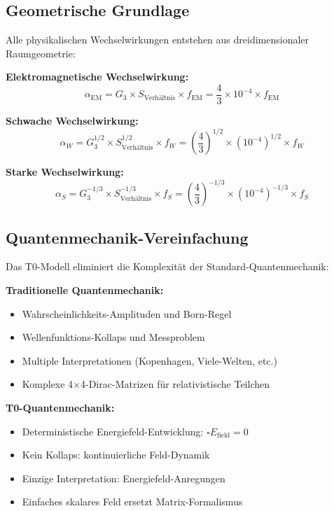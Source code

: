 \documentclass[12pt,a4paper]{report}
\begin{document}
	\subsection{Geometrische Grundlage}
	\label{subsec:geometric_foundation}
	
	Alle physikalischen Wechselwirkungen entstehen aus dreidimensionaler Raumgeometrie:
	
	\textbf{Elektromagnetische Wechselwirkung:}
	\begin{equation}
		\alpha_{\text{EM}} = G_3 \times S_{\text{Verhältnis}} \times f_{\text{EM}} = \frac{4}{3} \times 10^{-4} \times f_{\text{EM}}
	\end{equation}
	
	\textbf{Schwache Wechselwirkung:}
	\begin{equation}
		\alpha_W = G_3^{1/2} \times S_{\text{Verhältnis}}^{1/2} \times f_W = \left(\frac{4}{3}\right)^{1/2} \times (10^{-4})^{1/2} \times f_W
	\end{equation}
	
	\textbf{Starke Wechselwirkung:}
	\begin{equation}
		\alpha_S = G_3^{-1/3} \times S_{\text{Verhältnis}}^{-1/3} \times f_S = \left(\frac{4}{3}\right)^{-1/3} \times (10^{-4})^{-1/3} \times f_S
	\end{equation}
	
	\subsection{Quantenmechanik-Vereinfachung}
	\label{subsec:quantum_mechanics_simplification}
	
	Das T0-Modell eliminiert die Komplexität der Standard-Quantenmechanik:
	
	\textbf{Traditionelle Quantenmechanik:}
	\begin{itemize}
		\item Wahrscheinlichkeits-Amplituden und Born-Regel
		\item Wellenfunktions-Kollaps und Messproblem
		\item Multiple Interpretationen (Kopenhagen, Viele-Welten, etc.)
		\item Komplexe 4×4-Dirac-Matrizen für relativistische Teilchen
	\end{itemize}
	
	\textbf{T0-Quantenmechanik:}
	\begin{itemize}
		\item Deterministische Energiefeld-Entwicklung: $\square E_{\text{field}} = 0$
		\item Kein Kollaps: kontinuierliche Feld-Dynamik
		\item Einzige Interpretation: Energiefeld-Anregungen
		\item Einfaches skalares Feld ersetzt Matrix-Formalismus
	\end{itemize}
	
\end{document}
